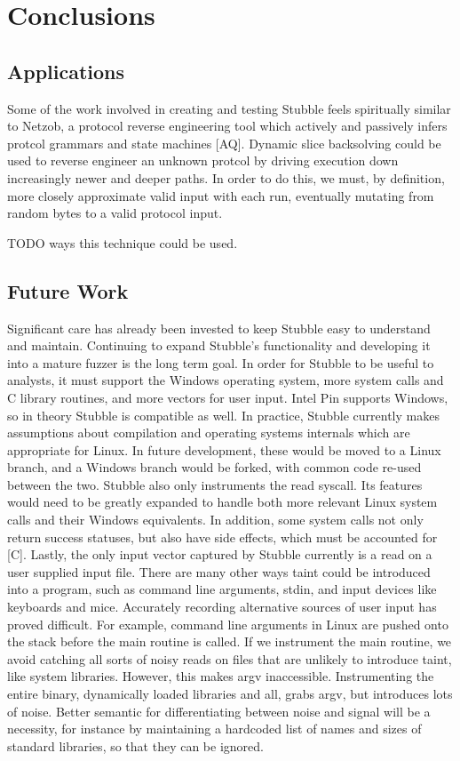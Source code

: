 \documentclass[11pt,expanded,copyright]{fsuthesis}
\begin{document}
	
\chapter{Conclusions}

\section{Applications}

Some of the work involved in creating and testing Stubble feels spiritually similar to Netzob, a protocol reverse engineering tool which actively and passively infers protcol grammars and state machines [AQ]. Dynamic slice backsolving could be used to reverse engineer an unknown protcol by driving execution down increasingly newer and deeper paths. In order to do this, we must, by definition, more closely approximate valid input with each run, eventually mutating from random bytes to a valid protocol input.

TODO ways this technique could be used.

\section{Future Work}

Significant care has already been invested to keep Stubble easy to understand and maintain. Continuing to expand Stubble's functionality and developing it into a mature fuzzer is the long term goal. In order for Stubble to be useful to analysts, it must support the Windows operating system, more system calls and C library routines, and more vectors for user input. Intel Pin supports Windows, so in theory Stubble is compatible as well. In practice, Stubble currently makes assumptions about compilation and operating systems internals which are appropriate for Linux. In future development, these would be moved to a Linux branch, and a Windows branch would be forked, with common code re-used between the two. Stubble also only instruments the read syscall. Its features would need to be greatly expanded to handle both more relevant Linux system calls and their Windows equivalents. In addition, some system calls not only return success statuses, but also have side effects, which must be accounted for [C]. Lastly, the only input vector captured by Stubble currently is a read on a user supplied input file. There are many other ways taint could be introduced into a program, such as command line arguments, stdin, and input devices like keyboards and mice. Accurately recording alternative sources of user input has proved difficult. For example, command line arguments in Linux are pushed onto the stack before the main routine is called. If we instrument the main routine, we avoid catching all sorts of noisy reads on files that are unlikely to introduce taint, like system libraries. However, this makes argv inaccessible. Instrumenting the entire binary, dynamically loaded libraries and all, grabs argv, but introduces lots of noise. Better semantic for differentiating between noise and signal will be a necessity, for instance by maintaining a hardcoded list of names and sizes of standard libraries, so that they can be ignored.
\end{document}
